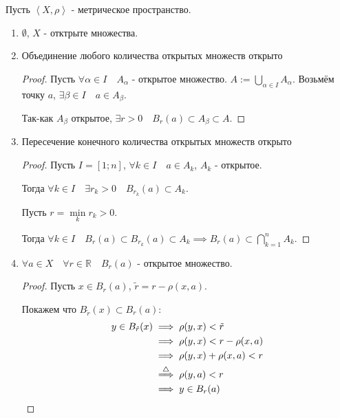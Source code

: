\begin{properties} \thmslashn

    Пусть $\left<X, \rho\right>$ - метрическое пространство.
    \begin{enumerate}
        \item $ \emptyset$, $X$ - отктрыте множества.
        \item Объединение любого количества открытых множеств открыто
            \begin{proof} \thmslashn
            
                Пусть $\forall{\alpha\in I}\quad A_{\alpha}$ - открытое множество. $A := \bigcup\limits_{\alpha\in I} A_{\alpha}$.
               Возьмём точку $a$,  $\exists{\beta\in I}\quad a\in A_{\beta}$.

               Так-как $A_{\beta}$ открытое, $\exists{r > 0}\quad B_{r}(a) \subset A_{\beta} \subset A$. 
            \end{proof}
        \item Пересечение конечного количества открытых множеств открыто
            \begin{proof} \thmslashn
            
                Пусть $I = [1; n]$, $\forall{k\in I}\quad a\in A_{k}$, $A_{k}$ - открытое.

                Тогда $\forall{k\in I}\quad \exists{r_{k} > 0}\quad B_{r_{k}}(a) \subset A_{k}$.

                Пусть $r = \min\limits_{k} r_{k} > 0$.

                Тогда $\forall{k\in I}\quad B_{r}(a) \subset B_{r_{k}}(a) \subset A_{k} \implies B_{r}(a) \subset \bigcap\limits_{k=1}^{n} A_{k}$.
            \end{proof}
        \item $\forall{a\in X}\quad \forall{r\in \mathbb{R}}\quad B_{r}(a)$ - открытое множество.
            \begin{proof} \thmslashn
                

                Пусть $x\in B_{r}(a)$, $\tilde{r} = r - \rho(x, a)$.

                Покажем что $B_{\tilde{r}}(x) \subset B_{r}(a)$:
                \begin{equation*}
                    \begin{split}
                        y\in B_{\tilde{r}}(x) 
                        &\implies \rho(y, x) < \tilde{r}\\
                        &\implies \rho(y, x) < r - \rho(x, a)\\
                        &\implies \rho(y, x) + \rho(x, a) < r\\
                        & \overset{\triangle}{\implies} \rho(y, a) < r\\
                        &\implies y\in B_{r}(a) \qedhere
                    \end{split}
                \end{equation*}
            \end{proof}
    \end{enumerate}
\end{properties}
